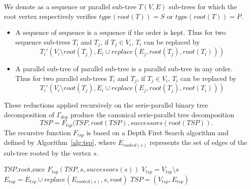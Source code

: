 \begin{mydef}
We denote as a sequence or parallel sub-tree $T(V,E)$ sub-trees for which the root vertex respectively verifies $type(root(T))=S$ or $type(root(T))=P$.
\end{mydef}

\begin{myth}
\begin{itemize}
\item A sequence of sequence is a sequence if the order is kept. Thus for two sequence sub-trees $T_i$ and $T_j$, if $T_j \in V_i$, $T_i$ can be replaced by 
\begin{equation*}
T_i'(V_i \setminus root(T_j),E_i \cup replace(E_j,root(T_j),root(T_i)))
\end{equation*}
\item A parallel sub-tree of parallel sub-tree is a parallel sub-tree in any order. Thus for two parallel sub-trees $T_i$ and $T_j$, if $T_j \in V_i$, $T_i$ can be replaced by 
\begin{equation*}
T_i'(V_i \setminus root(T_j),E_i \cup replace(E_j,root(T_j),root(T_i)))
\end{equation*}
\end{itemize}
\end{myth}

These reductions applied recursively on the serie-parallel binary tree decomposition of $\Gamma_{dep}$ produce the canonical serie-parallel tree decomposition 
\begin{equation*}
TSP = F_{tsp}(TSP,root(TSP),successors(root(TSP)).
\end{equation*}
The recursive function $F_{tsp}$ is based on a Depth First Search algorithm and defined by Algorithm~\ref{alg:tsp}, where $E_{rooted(s)}$ represents the set of edges of the sub-tree rooted by the vertex $s$.

\begin{algorithm}
\caption{$F_{tsp}$}
\label{alg:tsp}
\begin{algorithmic}[1]
 {$TSP$,root,succ}
\State $F_{tsp}(TSP,s,successors(s))$
\State $V_{tsp} = V_{tsp} \setminus s$
\State $E_{tsp} = E_{tsp} \cup replace(E_{rooted(s)},s,root)$
\State $TSP = (V_{tsp},E_{tsp})$
\EndIf
\EndIf
\EndFor
\EndProcedure
\end{algorithmic}
\end{algorithm}

